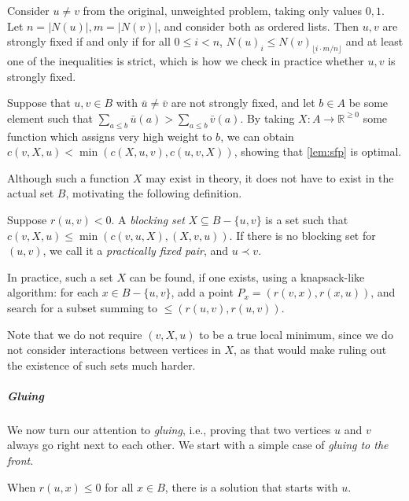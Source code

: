 \documentclass[a4paper,UKenglish,cleveref, autoref, thm-restate]{lipics-v2021}
\renewcommand{\b}{\prec}
\begin{document}
\begin{remark}
    Consider $u \neq v$ from the original, unweighted problem, taking only values $0, 1$. Let 
    $n = |N(u)|, m = |N(v)|$, and consider both as ordered lists. Then $u, v$ are strongly
    fixed if and only if for all $0 \leq i < n$, $N(u)_i \leq N(v)_{\lfloor i\cdot m/n
    \rfloor}$ and at least one of the inequalities is strict, which is how we check in practice whether $u, v$ is strongly fixed.
\end{remark}

\begin{remark}\label{rem:strongest}
    Suppose that $u, v \in B$ with $\bar u \neq \bar v$ are not strongly fixed, and let $b \in
    A$ be some element such
    that $\sum_{a \leq b} \bar u(a) > \sum_{a \leq b} \bar v(a)$. By taking $X: A \to \mathbb
    R^{\geq 0}$ some function which assigns very high
    weight to $b$, we can obtain $c(v, X, u) < \min(c(X, u, v), c(u, v, X))$, showing that
    \cref{lem:sfp} is optimal.
\end{remark}
Although such a function $X$ may exist in theory, it does
not have to exist in the actual set $B$, motivating the following definition.

\begin{lemma}\label{pfp}
  Suppose $r(u,v)< 0$.
    A \emph{blocking set} $X\subseteq B-\{u,v\}$ is a set such that $c(v,X,u) \leq \min(c(v, u,
    X), (X, v, u))$.  If there is no blocking set for $(u, v)$, we call it a
    \emph{practically fixed pair}, and $u\b v$.
\end{lemma}

In practice, such a set $X$ can be found, if one exists, using a knapsack-like algorithm: for
each $x\in B-\{u,v\}$, add a point $P_x = (r(v, x), r(x, u))$, and search for a subset summing
to ${\leq{}(r(u, v), r(u, v))}$.

Note that we do not require $(v, X, u)$ to be a true local minimum, since we do
not consider interactions between vertices in $X$, as that would make ruling out the
existence of such sets much harder.

\subparagraph{Gluing}
We now turn our attention to \emph{gluing}, i.e., proving that two vertices $u$
and $v$ always go right next to each other. We start with a simple case of
\emph{gluing to the front}.

\begin{lemma}[Greedy]\label{greedy}
  When $r(u, x)\leq 0$ for all $x\in B$, there is a solution that
  starts with $u$.
\end{lemma}
\end{document}
